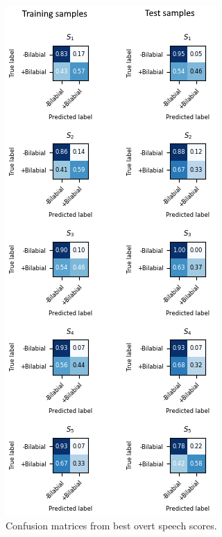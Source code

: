 \begin{figure}[h!]
	\centering
	\includegraphics[scale=1.2]{Figures/CM_Overt.png}
	\caption{Confusion matrices from best overt speech scores.}
	\label{Fig: CM_Overt}
\end{figure}

